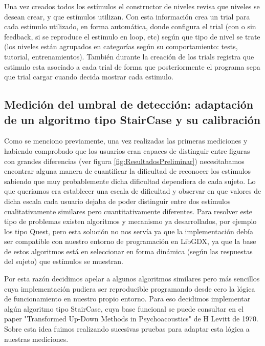 \documentclass{article}
\begin{document}
    Una vez creados todos los estímulos el constructor de niveles revisa que niveles se desean crear, y que estímulos utilizan. Con esta información crea un trial para cada estimulo utilizado, en forma automática, donde configura el trial (con o sin feedback, si se reproduce el estimulo en loop, etc) según que tipo de nivel se trate (los niveles están agrupados en categorías según su comportamiento: tests, tutorial, entrenamientos). También durante la creación de los trials registra que estimulo esta asociado a cada trial de forma que posteriormente el programa sepa que trial cargar cuando decida mostrar cada estimulo. 
    
    \subsection{Medición del umbral de detección: adaptación de un algoritmo tipo StairCase y su calibración}
    \label{seccion:staircase}
    
    Como se menciono previamente, una vez realizadas las primeras mediciones y habiendo comprobado que los usuarios eran capaces de distinguir entre figuras con grandes diferencias (ver figura \ref{fig:ResultadosPreliminar}) necesitabamos encontrar alguna manera de cuantificar la dificultad de reconocer los estímulos sabiendo que muy probablemente dicha dificultad dependiera de cada sujeto. Lo que queriamos era establecer una escala de dificultad y observar en que valores de dicha escala cada usuario dejaba de poder distinguir entre dos estímulos cualitativamente similares pero cuantitativamente diferentes. Para resolver este tipo de problemas existen algoritmos y mecanismo ya desarrollados, por ejemplo los tipo Quest, pero esta solución no nos servía ya que la implementación debía ser compatible con nuestro entorno de programación en LibGDX, ya que la base de estos algoritmos está en seleccionar en forma dinámica (según las respuestas del sujeto) que estímulos se muestran. 
    
    Por esta razón decidimos apelar a algunos algoritmos similares pero más sencillos cuya implementación pudiera ser reproducible programando desde cero la lógica de funcionamiento en nuestro propio entorno. Para eso decidimos implementar algún algoritmo tipo StairCase, cuya base funcional se puede consultar en el paper "Transformed Up-Down Methods in Psychoacoustics"\cite{staircase} de H Levitt de 1970. Sobre esta idea fuimos realizando sucesivas pruebas para adaptar esta lógica a nuestras mediciones. 
    
\end{document}
